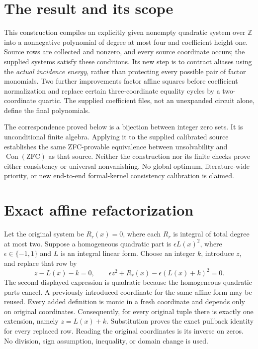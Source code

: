 \section{The result and its scope}
This construction compiles an explicitly given nonempty quadratic system over
\(\mathbb Z\) into a nonnegative polynomial of degree at most four and
coefficient height one. Source rows are collected and nonzero, and every
source coordinate occurs; the supplied systems satisfy these conditions. Its
new step is to contract aliases using the \emph{actual incidence energy},
rather than protecting every possible pair of factor monomials. Two further
improvements factor affine squares before coefficient normalization and
replace certain three-coordinate equality cycles by a two-coordinate
quartic. The supplied coefficient files, not an unexpanded circuit alone,
define the final polynomials.

The correspondence proved below is a bijection between integer zero sets.
It is unconditional finite algebra. Applying it to the supplied calibrated
source establishes the same ZFC-provable equivalence between unsolvability
and \(\operatorname{Con}(\mathrm{ZFC})\) as that source. Neither the
construction nor its finite checks prove either consistency or universal
nonvanishing. No global optimum, literature-wide priority, or new
end-to-end formal-kernel consistency calibration is claimed.

\section{Exact affine refactorization}
Let the original system be \(R_r(x)=0\), where each \(R_r\) is integral
of total degree at most two. Suppose a homogeneous quadratic part is
\(\epsilon L(x)^2\), where \(\epsilon\in\{-1,1\}\) and \(L\) is
an integral linear form. Choose an integer \(k\), introduce \(z\), and
replace that row by
\[
 z-L(x)-k=0,\qquad
 \epsilon z^2+R_r(x)-\epsilon(L(x)+k)^2=0.
\]
The second displayed expression is quadratic because the homogeneous
quadratic parts cancel. A previously introduced coordinate for the same
affine form may be reused. Every added definition is monic in a fresh
coordinate and depends only on original coordinates. Consequently, for
every original tuple there is exactly one extension, namely
\(z=L(x)+k\). Substitution proves the exact pullback identity for every
replaced row. Reading the original coordinates is its inverse on zeros.
No division, sign assumption, inequality, or domain change is used.

